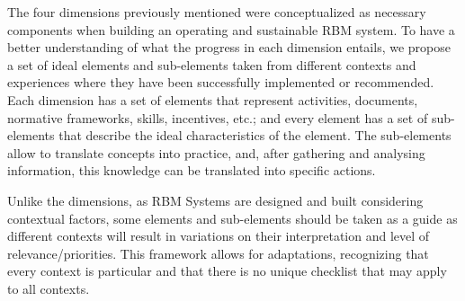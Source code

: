 \documentclass[
  10pt,
]{book}
\begin{document}
The four dimensions previously mentioned were conceptualized as necessary components when building an operating and sustainable RBM system. To have a better understanding of what the progress in each dimension entails, we propose a set of ideal elements and sub-elements taken from different contexts and experiences where they have been successfully implemented or recommended. Each dimension has a set of elements that represent activities, documents, normative frameworks, skills, incentives, etc.; and every element has a set of sub-elements that describe the ideal characteristics of the element. The sub-elements allow to translate concepts into practice, and, after gathering and analysing information, this knowledge can be translated into specific actions.

Unlike the dimensions, as RBM Systems are designed and built considering contextual factors, some elements and sub-elements should be taken as a guide as different contexts will result in variations on their interpretation and level of relevance/priorities. This framework allows for adaptations, recognizing that every context is particular and that there is no unique checklist that may apply to all contexts.
\end{document}
